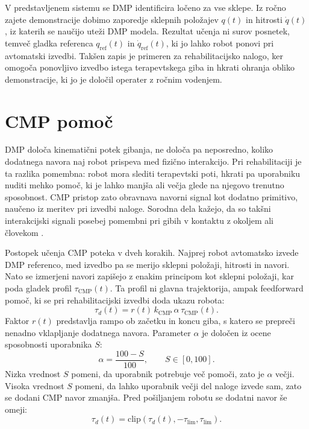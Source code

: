 \documentclass[a4paper]{article}
\begin{document}
V predstavljenem sistemu se DMP identificira ločeno za vse sklepe. Iz ročno
zajete demonstracije dobimo zaporedje sklepnih položajev $q(t)$ in hitrosti
$\dot{q}(t)$, iz katerih se naučijo uteži DMP modela. Rezultat učenja ni surov
posnetek, temveč gladka referenca $q_\mathrm{ref}(t)$ in
$\dot{q}_\mathrm{ref}(t)$, ki jo lahko robot ponovi pri avtomatski izvedbi.
Takšen zapis je primeren za rehabilitacijsko nalogo, ker omogoča ponovljivo
izvedbo istega terapevtskega giba in hkrati ohranja obliko demonstracije, ki jo
je določil operater z ročnim vodenjem.

\section{CMP pomoč}

DMP določa kinematični potek gibanja, ne določa pa neposredno, koliko dodatnega
navora naj robot prispeva med fizično interakcijo. Pri rehabilitaciji je ta
razlika pomembna: robot mora slediti terapevtski poti, hkrati pa uporabniku
nuditi mehko pomoč, ki je lahko manjša ali večja glede na njegovo trenutno
sposobnost. CMP pristop zato obravnava navorni signal kot dodatno primitivo,
naučeno iz meritev pri izvedbi naloge. Sorodna dela kažejo, da so takšni
interakcijski signali posebej pomembni pri gibih v kontaktu z okoljem ali
človekom \cite{gams2014coupling}.

Postopek učenja CMP poteka v dveh korakih. Najprej robot avtomatsko izvede DMP
referenco, med izvedbo pa se merijo sklepni položaji, hitrosti in navori. Nato
se izmerjeni navori zapišejo z enakim principom kot sklepni položaji, kar poda
gladek profil $\tau_\mathrm{CMP}(t)$. Ta profil ni glavna trajektorija, ampak
feedforward pomoč, ki se pri rehabilitacijski izvedbi doda ukazu robota:
\begin{equation}
    \tau_d(t) =
    r(t)\, k_\mathrm{CMP}\,\alpha\,\tau_\mathrm{CMP}(t).
    \label{eq:tauadd}
\end{equation}
Faktor $r(t)$ predstavlja rampo ob začetku in koncu giba, s katero se prepreči
nenadno vklapljanje dodatnega navora. Parameter $\alpha$ je določen iz ocene
sposobnosti uporabnika $S$:
\begin{equation}
    \alpha=\frac{100-S}{100}, \qquad S\in[0,100].
    \label{eq:alpha}
\end{equation}
Nizka vrednost $S$ pomeni, da uporabnik potrebuje več pomoči, zato je
$\alpha$ večji. Visoka vrednost $S$ pomeni, da lahko uporabnik večji del naloge
izvede sam, zato se dodani CMP navor zmanjša. Pred pošiljanjem robotu se
dodatni navor še omeji:
\begin{equation}
    \tau_d(t) = \mathrm{clip}\left(\tau_d(t),
    -\tau_\mathrm{lim},\tau_\mathrm{lim}\right).
    \label{eq:clip}
\end{equation}
\end{document}
